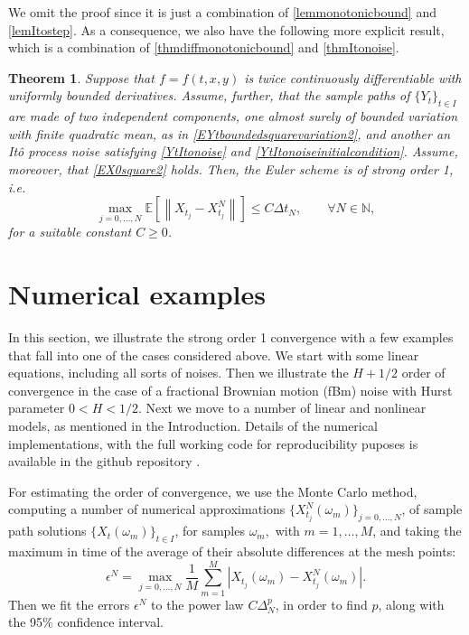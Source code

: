 \documentclass[reqno,12pt]{amsart}
\theoremstyle{plain} %
\newtheorem{theorem}{Theorem}[section]
\theoremstyle{definition} %
\begin{document}
We omit the proof since it is just a combination of \cref{lemmonotonicbound} and \cref{lemItostep}. As a consequence, we also have the following more explicit result, which is a combination of \cref{thmdiffmonotonicbound} and \cref{thmItonoise}.

\begin{theorem}
    \label{thmmixedcasepractical}
    Suppose that $f=f(t, x, y)$ is twice continuously differentiable with uniformly bounded derivatives. Assume, further, that the sample paths of $\{Y_t\}_{t\in I}$ are made of two independent components, one almost surely of bounded variation with finite quadratic mean, as in \eqref{EYtboundedsquarevariation2}, and another an It\^o process noise satisfying \eqref{YtItonoise} and \eqref{YtItonoiseinitialcondition}. Assume, moreover, that \eqref{EX0square2} holds. Then, the Euler scheme is of strong order 1, i.e.
    \begin{equation}
        \max_{j=0, \ldots, N}\mathbb{E}\left[ \left\| X_{t_j} - X_{t_j}^N \right\| \right] \leq C \Delta t_N, \qquad \forall N \in \mathbb{N},
    \end{equation}
    for a suitable constant $C \geq 0$.
\end{theorem}

\section{Numerical examples}
\label{secnumericalexamples}

In this section, we illustrate the strong order 1 convergence with a few examples that fall into one of the cases considered above. We start with some linear equations, including all sorts of noises. Then we illustrate the $H + 1/2$ order of convergence in the case of a fractional Brownian motion (fBm) noise with Hurst parameter $0 < H < 1/2$. Next we move to a number of linear and nonlinear models, as mentioned in the Introduction. Details of the numerical implementations, with the full working code for reproducibility puposes is available in the github repository \cite{RODEConvEM2023}.

For estimating the order of convergence, we use the Monte Carlo method, computing a number of numerical approximations $\{X_{t_j}^N(\omega_m)\}_{j=0, \ldots, N}$, of sample path solutions $\{X_t(\omega_m)\}_{t\in I}$, for samples $\omega_m,$ with $m = 1, \ldots, M$, and taking the maximum in time of the average of their absolute differences at the mesh points:
\begin{equation}
    \epsilon^N = \max_{j=0, \ldots, N} \frac{1}{M}\sum_{m=1}^M \left|X_{t_j}(\omega_m) - X_{t_j}^N(\omega_m)\right|.
\end{equation}
Then we fit the errors $\epsilon^N$ to the power law $C\Delta_N^p$, in order to find $p$, along with the 95\% confidence interval.
\end{document}
